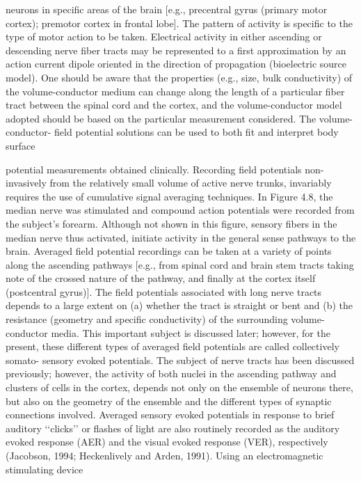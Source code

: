 neurons in specific areas of the brain [e.g., precentral gyrus (primary motor
cortex); premotor cortex in frontal lobe]. The pattern of activity is specific to
the type of motor action to be taken.
Electrical activity in either ascending or descending nerve fiber tracts may
be represented to a first approximation by an action current dipole oriented in
the direction of propagation (bioelectric source model). One should be aware
that the properties (e.g., size, bulk conductivity) of the volume-conductor
medium can change along the length of a particular fiber tract between the
spinal cord and the cortex, and the volume-conductor model adopted should
be based on the particular measurement considered. The volume-conductor-
field potential solutions can be used to both fit and interpret body surface

potential measurements obtained clinically. Recording field potentials non-
invasively from the relatively small volume of active nerve trunks, invariably
requires the use of cumulative signal averaging techniques. In Figure 4.8, the
median nerve was stimulated and compound action potentials were recorded
from the subject’s forearm. Although not shown in this figure, sensory fibers in
the median nerve thus activated, initiate activity in the general sense pathways
to the brain. Averaged field potential recordings can be taken at a variety of
points along the ascending pathways [e.g., from spinal cord and brain stem
tracts taking note of the crossed nature of the pathway, and finally at the cortex
itself (postcentral gyrus)]. The field potentials associated with long nerve tracts
depends to a large extent on (a) whether the tract is straight or bent and (b) the
resistance (geometry and specific conductivity) of the surrounding volume-
conductor media.
This important subject is discussed later; however, for the present, these
different types of averaged field potentials are called collectively somato-
sensory evoked potentials. The subject of nerve tracts has been discussed
previously; however, the activity of both nuclei in the ascending pathway
and clusters of cells in the cortex, depends not only on the ensemble of neurons
there, but also on the geometry of the ensemble and the different types of
synaptic connections involved.
Averaged sensory evoked potentials in response to brief auditory ‘‘clicks’’
or flashes of light are also routinely recorded as the auditory evoked response
(AER) and the visual evoked response (VER), respectively (Jacobson, 1994;
Heckenlively and Arden, 1991). Using an electromagnetic stimulating device
